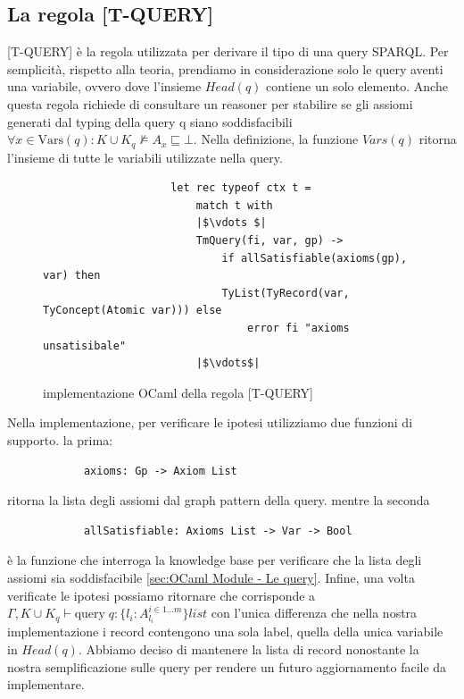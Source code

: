             \subsection{La regola [T-QUERY]}
            [T-QUERY] è la regola utilizzata per derivare il tipo di una query SPARQL. Per semplicità, rispetto alla teoria, prendiamo in considerazione solo le query
            aventi una variabile, ovvero dove l'insieme $Head(q)$ contiene un solo elemento. Anche questa regola richiede di consultare un reasoner per stabilire se
            gli assiomi generati dal typing della query q siano soddisfacibili $\forall x \in \textrm{Vars}(q) : K \cup K_q \nvDash A_x \sqsubseteq \bot$.
            Nella definizione, la funzione $Vars(q)$ ritorna l'insieme di tutte le variabili utilizzate nella query.
            \begin{figure}[h]
                \begin{verbatim}
                    let rec typeof ctx t =
                        match t with
                        |$\vdots $|
                        TmQuery(fi, var, gp) ->
                            if allSatisfiable(axioms(gp), var) then
                            TyList(TyRecord(var, TyConcept(Atomic var))) else
                                error fi "axioms unsatisibale"
                        |$\vdots$|
                \end{verbatim}
            \caption{implementazione OCaml della regola [T-QUERY]}
            \end{figure}
   
   Nella implementazione, per verificare le ipotesi utilizziamo due funzioni di supporto. la prima:
            \begin{verbatim}
            axioms: Gp -> Axiom List
            \end{verbatim}
            ritorna la lista degli assiomi dal graph pattern della query. mentre la seconda
            \begin{verbatim}
            allSatisfiable: Axioms List -> Var -> Bool
            \end{verbatim}
            è la funzione che interroga la knowledge base per verificare che la lista degli assiomi sia soddisfacibile \ref{sec:OCaml Module - Le query}. Infine, una volta verificate le ipotesi possiamo
            ritornare
             che corrisponde a $\Gamma,K \cup K_q \vdash \textrm{query} \; q : \{l_i : A_{l_i}^{i \in 1...m}\} list$
            con l'unica differenza che nella nostra implementazione i record contengono una sola label, quella della unica variabile in $Head(q)$. Abbiamo deciso di
            mantenere la lista di record nonostante la nostra semplificazione sulle query per rendere un futuro aggiornamento facile da implementare.
